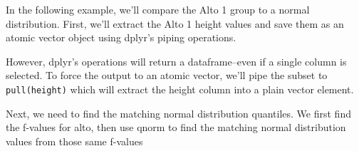 \documentclass[]{book}
\newenvironment{Shaded}{\begin{snugshade}}{\end{snugshade}}
\newcommand{\CommentTok}[1]{\textcolor[rgb]{0.56,0.35,0.01}{\textit{#1}}}
\newcommand{\KeywordTok}[1]{\textcolor[rgb]{0.13,0.29,0.53}{\textbf{#1}}}
\newcommand{\NormalTok}[1]{#1}
\newcommand{\OperatorTok}[1]{\textcolor[rgb]{0.81,0.36,0.00}{\textbf{#1}}}
\newcommand{\StringTok}[1]{\textcolor[rgb]{0.31,0.60,0.02}{#1}}
\begin{document}
In the following example, we'll compare the Alto 1 group to a normal distribution. First, we'll extract the Alto 1 height values and save them as an atomic vector object using dplyr's piping operations.

However, dplyr's operations will return a dataframe--even if a single column is selected. To force the output to an atomic vector, we'll pipe the subset to \texttt{pull(height)} which will extract the height column into a plain vector element.

\begin{Shaded}
\end{Shaded}

Next, we need to find the matching normal distribution quantiles. We first find the f-values for alto, then use qnorm to find the matching normal distribution values from those same f-values
\end{document}
